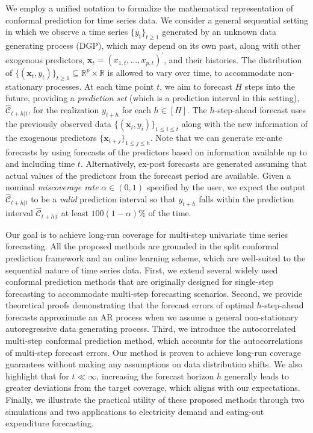 \documentclass[
  11pt,
  a4paper,
]{article}
\theoremstyle{plain}
\theoremstyle{remark}
\begin{document}
We employ a unified notation to formalize the mathematical
representation of conformal prediction for time series data. We consider
a general sequential setting in which we observe a time series
\(\{y_t\}_{t \geq 1}\) generated by an unknown data generating process
(DGP), which may depend on its own past, along with other exogenous
predictors, \(\bm{x}_t=(x_{1,t},\ldots,x_{p,t})^{\prime}\), and their
histories. The distribution of
\(\{(\bm{x}_t, y_t)\}_{t \geq 1} \subseteq \mathbb{R}^p \times \mathbb{R}\)
is allowed to vary over time, to accommodate non-stationary processes.
At each time point \(t\), we aim to forecast \(H\) steps into the
future, providing a \emph{prediction set} (which is a prediction
interval in this setting), \(\hat{\mathcal{C}}_{t+h|t}\), for the
realization \(y_{t+h}\) for each \(h\in[H]\). The \(h\)-step-ahead
forecast uses the previously observed data
\(\{(\bm{x}_i, y_i)\}_{1 \leq i \leq t}\) along with the new information
of the exogenous predictors \(\{\bm{x}_{t+j}\}_{1\leq j\leq h}\). Note
that we can generate ex-ante forecasts by using forecasts of the
predictors based on information available up to and including time
\(t\). Alternatively, ex-post forecasts are generated assuming that
actual values of the predictors from the forecast period are available.
Given a nominal \emph{miscoverage rate} \(\alpha \in (0,1)\) specified
by the user, we expect the output \(\hat{\mathcal{C}}_{t+h|t}\) to be a
\emph{valid} prediction interval so that \(y_{t+h}\) falls within the
prediction interval \(\hat{\mathcal{C}}_{t+h|t}\) at least
\(100(1-\alpha)\%\) of the time.

Our goal is to achieve long-run coverage for multi-step univariate time
series forecasting. All the proposed methods are grounded in the split
conformal prediction framework and an online learning scheme, which are
well-suited to the sequential nature of time series data. First, we
extend several widely used conformal prediction methods that are
originally designed for single-step forecasting to accommodate
multi-step forecasting scenarios. Second, we provide theoretical proofs
demonstrating that the forecast errors of optimal \(h\)-step-ahead
forecasts approximate an AR process when we assume a general
non-stationary autoregressive data generating process. Third, we
introduce the autocorrelated multi-step conformal prediction method,
which accounts for the autocorrelations of multi-step forecast errors.
Our method is proven to achieve long-run coverage guarantees without
making any assumptions on data distribution shifts. We also highlight
that for \(t \ll \infty\), increasing the forecast horizon \(h\)
generally leads to greater deviations from the target coverage, which
aligns with our expectations. Finally, we illustrate the practical
utility of these proposed methods through two simulations and two
applications to electricity demand and eating-out expenditure
forecasting.
\end{document}
